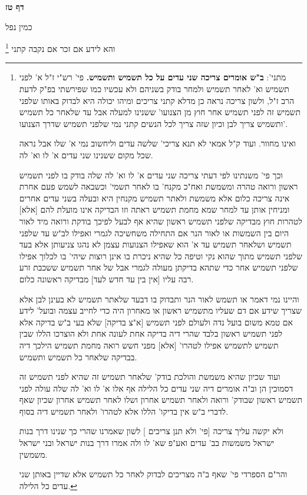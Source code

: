\documentclass[12pt, openany]{book}
\newcommand{\sethebfont}{
\fontsize{10.5pt}{21.0pt} \selectfont
}
\newcommand{\twocol}[1]{
	{\sethebfont \begin{multicols}{2}
			#1
	\end{multicols}}	
}
\newcommand{\sectname}{}
\newcommand{\newsection}[1]{
	\addcontentsline{toc}{section}{#1}
	\renewcommand{\sectname}{#1}	
	\vspace{-\baselineskip}
	\begin{center}
		\textbf{%
\fontsize{16pt}{16pt}\selectfont
			#1}
	\end{center}
	\vspace{-\baselineskip}
	\nopagebreak
}
\newcommand{\footnotecomment}[1]{
	\renewcommand\thefootnote{}
	\footnote{#1}}
\newcommand{\commenta}[1]{\footnotecomment{#1}}
\begin{document}
\newsection{דף טז}
\twocol{כמין נפל 
\commenta{מתני': \textbf{ב"ש אומרים צריכה שני עדים על כל תשמיש ותשמיש.} פי' רש"י ז"ל א' לפני תשמיש וא' לאחר תשמיש ולמחר בודק בשניהם ולא עכשיו כמו שפירשתי בפ"ק לדעת הרב ז"ל, ולשון צריכה נראה כן מדלא קתני צריכים ומיהו יכולה היא לבדוק באותו שלפני תשמיש זה לפני תשמיש אחר חוץ מן הצנועו' ששנינו למעלה אבל עד שלאחר כל תשמיש ותשמיש צריך לבן וכיון שזה צריך לכל הנשים קתני נמי שלפני תשמיש שדרך הצנועו'.\par ואינו מחוור. ועוד ק"ל אמאי לא תנא צריכי' שלשה עדים וליחשוב נמי א' שלו אבל נראה שכל מקום ששנינו שני עדים א' לו וא' לה.\par וכך פי' משנתינו לפי דעתי צריכה שני עדים א' לו וא' לה שלה בודק בו לפני תשמיש ראשון ורואה טהרה ומשמשת ואח"כ מקנח' בו לאחר תשמי' וכשבאה לשמש פעם אחרת אינה צריכה כלום אלא משמשת ולאתר תשמיש מקנחין היא ובעלה בשני עדים אחרים ומניחין אותן עד למחר שמא מחמת תשמיש ראתה וזו הבדיקה אינו מועלת להם [אלא] לטהרות חוץ מבדיקה שלפני תשמיש ראשון שהיא אף לבעל לפיכך בודקת ורואה מיד לאור היום בין השמשות או לאור הנר אם התחילה משחשיכה לגמרי ואפילו לב"ש עד שלפני תשמיש ושלאחר תשמיש עד א' הוא שאפילו הצנועות עצמן לא נהגו צניעותן אלא בעד שלפני תשמיש מתוך שהוא נקי וטיפה כל שהיא ניכרת בו אינן רוצות שיהי' בו לכלוך אפילו שלפני תשמיש אחר כדי שתהא בדיקתן מעולה לגמרי אבל של אחר תשמיש ששכבת זרע רבה עליו [אין בין עד חדש לעד] מבדיקה ראשונה כלום.\par והיינו נמי דאמר או תשמש לאור הנר ותבדוק בו דבעד שלאתר תשמיש לא בעינן לבן אלא שצריך שידע אם דם שעליו מתשמיש ראשון או מאחרון היה כדי לחייב עצמה ובועל' לידע אם טמא משום בועל נדה ולעולם לפני תשמיש [א"צ בדיקה] שלא בעי ב"ש בדיקה אלא לפני תשמיש ראשון בלבד שהרי דיה בדיקה אחת לעונה אחת ולא הוצרכו הללו שבין תשמיש לתשמיש אפילו לטהרו' [אלא] מפני חשש רואה מחמת תשמיש הילכך דיה בבדיקה שלאחר כל תשמיש ותשמיש.\par ועוד שכיון שהיא משמשת והולכת בודק' שלאחר תשמיש זה שהיא לפני תשמיש זה דסמוכין הן וב"ה אומרים דיה שני עדים כל הלילה אף אלו א' לו וא' לה שלה עולה לפני תשמיש ראשון שבודק' ורואה ולאחר תשמיש אחרון ושלו לאחר תשמיש אחרון שכיון שאף לדברי ב"ש אין בדיקו' הללו אלא לטהרו' ולאחר תשמיש דיה בסוף.\par ולא יקשה עליך צריכה [{\small פי' ולא תנן צריכים} ] לשון שאמרנו שהרי כך שנינו דרך בנות ישראל משמשות בב' עדים ואע"פ שא' לו ולה אמרו דרך בנות ישראל ובני ישראל משמשין.\par והר"ם הספרדי פי' שאף ב"ה מצריכים לבדוק לאחר כל תשמיש אלא שדיין באותן שני עדים כל הלילה. }
והא לידע אם זכר אם נקבה קתני 
}
\end{document}

